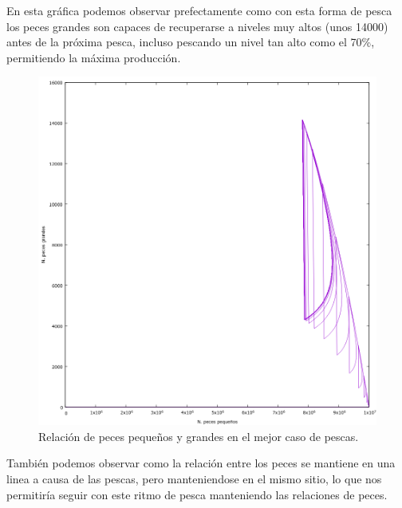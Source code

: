 \documentclass[12pt, spanish]{article}
\begin{document}
En esta gráfica podemos observar prefectamente como con esta forma de pesca los peces grandes son capaces de recuperarse a niveles muy altos (unos 14000) antes de la próxima pesca, incluso pescando un nivel tan alto como el 70\%, permitiendo la máxima producción.


\begin{figure}[H]
	\centering
	\includegraphics[scale = 0.6]{pesca_ratio.png}
	\caption{Relación de peces pequeños y grandes en el mejor caso de pescas.}
	\label{fig:ej4}
\end{figure}

También podemos observar como la relación entre los peces se mantiene en una linea a causa de las pescas, pero manteniendose en el mismo sitio, lo que nos permitiría seguir con este ritmo de pesca manteniendo las relaciones de peces.

%
%
\end{document}
